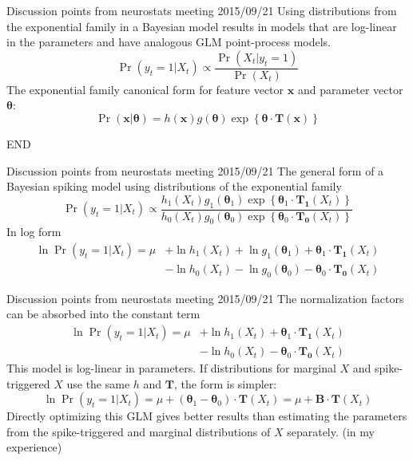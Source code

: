 \documentclass[svgnames,13pt,handout]{beamer}
\begin{document}
\begin{frame}{Discussion points from neurostats meeting 2015/09/21}
Using distributions from the exponential family in a Bayesian model results in models that are log-linear in the parameters and have analogous GLM point-process models.
~
\[\Pr(y_t=1 | X_t) \propto \frac
{\Pr(X_t|y_t=1)}
{\Pr(X_t)}
\]
The exponential family canonical form for feature vector $\mathbf{x}$ and parameter vector ${\boldsymbol \theta}$:
\[
\Pr(\mathbf{x}|\boldsymbol \theta) = h(\mathbf{x}) g(\boldsymbol \theta) \exp\left\{{\boldsymbol \theta} \cdot \mathbf{T}(\mathbf{x})\right\}
\]
\end{frame} 

\begin{frame}{}
END
\end{frame} 

\begin{frame}{Discussion points from neurostats meeting 2015/09/21}
The general form of a Bayesian spiking model using distributions of the exponential family 
\[\Pr(y_t=1 | X_t) \propto \frac {
h_1(X_t) g_1(\boldsymbol \theta_1) \exp \left\{{\boldsymbol \theta_1} \cdot \mathbf{T_1}(X_t) \right\}}{
h_0(X_t) g_0(\boldsymbol \theta_0) \exp \left\{{\boldsymbol \theta_0} \cdot \mathbf{T_0}(X_t) \right\}}
\]
In log form
\[\textstyle 
\begin{aligned}
\ln\Pr(y_t=1 | X_t) = \mu
&+ \ln h_1(X_t)
+ \ln g_1(\boldsymbol \theta_1)
+ {\boldsymbol \theta_1} \cdot \mathbf{T_1}(X_t)\\
~&- \ln h_0(X_t) 
- \ln g_0(\boldsymbol \theta_0) 
- {\boldsymbol \theta_0} \cdot \mathbf{T_0}(X_t)
\end{aligned}
\]
\end{frame} 

\begin{frame}{Discussion points from neurostats meeting 2015/09/21}
The normalization factors can be absorbed into the constant term
\[\textstyle 
\begin{aligned}
\ln\Pr(y_t=1 | X_t) = \mu
&+ \ln h_1(X_t)
+ {\boldsymbol \theta_1} \cdot \mathbf{T_1}(X_t)\\
~&- \ln h_0(X_t) 
- {\boldsymbol \theta_0} \cdot \mathbf{T_0}(X_t)
\end{aligned}
\]
This model is log-linear in parameters. If distributions for marginal $X$ and spike-triggered $X$ use the same $h$ and $\mathbf{T}$, the form is simpler:
\[
\ln\Pr(y_t=1 | X_t) = \mu + ({\boldsymbol \theta_1}-{\boldsymbol \theta_0}) \cdot \mathbf{T}(X_t) = \mu + \mathbf{B}\cdot\mathbf{T}(X_t)
\]
Directly optimizing this GLM gives better results than estimating the parameters from the spike-triggered and marginal distributions of $X$ separately. (in my experience)
\end{frame} 
\end{document}
